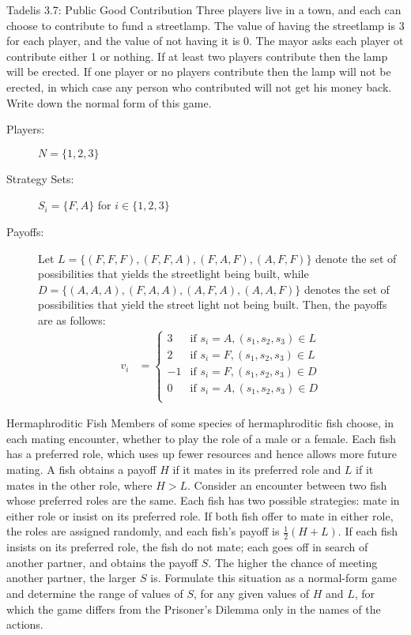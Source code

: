 \documentclass[10pt]{extarticle}
\title{}
\author{Avinash Iyer}
\date{}
\begin{document}
  \begin{problem}{Tadelis 3.7: Public Good Contribution}
    Three players live in a town, and each can choose to contribute to fund a streetlamp. The value of having the streetlamp is $3$ for each player, and the value of not having it is 0. The mayor asks each player ot contribute either 1 or nothing. If at least two players contribute then the lamp will be erected. If one player or no players contribute then the lamp will not be erected, in which case any person who contributed will not get his money back. Write down the normal form of this game.
    \tcblower
    \begin{description}
      \item[Players:] $N = \{1,2,3\}$
      \item[Strategy Sets:] $S_i = \{F,A\}$ for $i\in \{1,2,3\}$
      \item[Payoffs:] Let $L = \{(F,F,F),(F,F,A),(F,A,F),(A,F,F)\}$ denote the set of possibilities that yields the streetlight being built, while $D = \{(A,A,A),(F,A,A),(A,F,A),(A,A,F)\}$ denotes the set of possibilities that yield the street light not being built. Then, the payoffs are as follows:
        \begin{align*}
          v_i &= \begin{cases}
            3 &\textrm{if } s_i = A,(s_1,s_2,s_3)\in L\\
            2 &\textrm{if } s_i = F,(s_1,s_2,s_3)\in L \\
            -1 &\textrm{if } s_i=F,(s_1,s_2,s_3)\in D\\
            0 &\textrm{if } s_i=A,(s_1,s_2,s_3)\in D\\
          \end{cases}
        \end{align*}
    \end{description}
  \end{problem}
  \begin{problem}{Hermaphroditic Fish}
    Members of some species of hermaphroditic fish choose, in each mating encounter, whether to play the role of a male or a female. Each fish has a preferred role, which uses up fewer resources and hence allows more future mating. A fish obtains a payoff $H$ if it mates in its preferred role and $L$ if it mates in the other role, where $H>L$. Consider an encounter between two fish whose preferred roles are the same. Each fish has two possible strategies: mate in either role or insist on its preferred role. If both fish offer to mate in either role, the roles are assigned randomly, and each fish's payoff is $\frac{1}{2}(H+L)$. If each fish insists on its preferred role, the fish do not mate; each goes off in search of another partner, and obtains the payoff $S$. The higher the chance of meeting another partner, the larger $S$ is. Formulate this situation as a normal-form game and determine the range of values of $S$, for any given values of $H$ and $L$, for which the game differs from the Prisoner's Dilemma only in the names of the actions.
  \end{problem}
\end{document}
